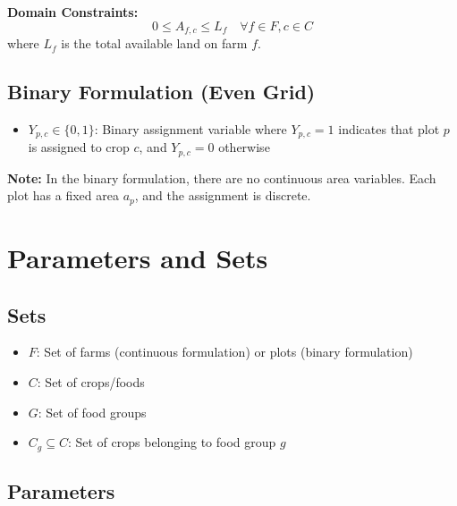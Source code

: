 \documentclass{article}
\begin{document}
\textbf{Domain Constraints:}
$$0 \leq A_{f,c} \leq L_f \quad \forall f \in F, c \in C$$
where $L_f$ is the total available land on farm $f$.

\subsection{Binary Formulation (Even Grid)}

\begin{itemize}
    \item $Y_{p,c} \in \{0,1\}$: Binary assignment variable where $Y_{p,c} = 1$ indicates that plot $p$ is assigned to crop $c$, and $Y_{p,c} = 0$ otherwise
\end{itemize}

\textbf{Note:} In the binary formulation, there are no continuous area variables. Each plot has a fixed area $a_p$, and the assignment is discrete.

\section{Parameters and Sets}

\subsection{Sets}
\begin{itemize}
    \item $F$: Set of farms (continuous formulation) or plots (binary formulation)
    \item $C$: Set of crops/foods
    \item $G$: Set of food groups
    \item $C_g \subseteq C$: Set of crops belonging to food group $g$
\end{itemize}

\subsection{Parameters}
\end{document}

